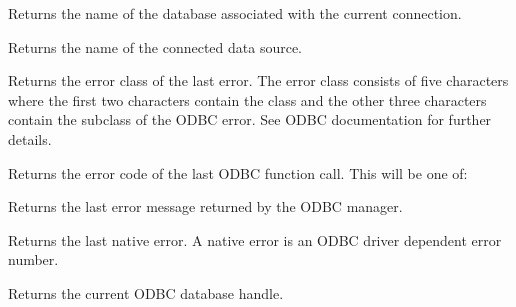 

Returns the name of the database associated with the current connection.



Returns the name of the connected data source.
  


Returns the error class of the last error. The error class consists of
five characters where the first two characters contain the class
and the other three characters contain the subclass of the ODBC error.
See ODBC documentation for further details.



Returns the error code of the last ODBC function call. This will be one of:

\begin{twocollist}\itemsep=0pt
\end{twocollist}


  
Returns the last error message returned by the ODBC manager.



Returns the last native error. A native error is an ODBC driver dependent
error number.



Returns the current ODBC database handle.

